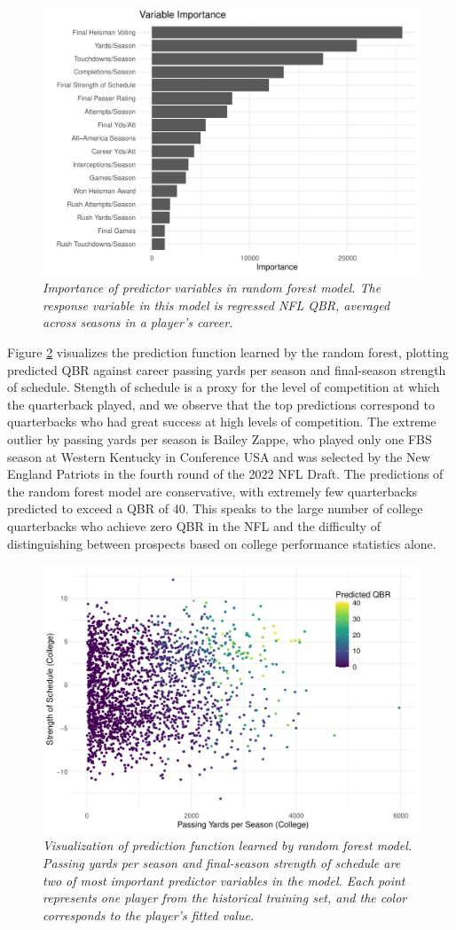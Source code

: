 \documentclass{article}
\begin{document}
\begin{figure}
    \centering
    \includegraphics[width=0.5\linewidth]{figures/variable_importance.pdf}
    \caption{\it Importance of predictor variables in random forest model. The response variable in this model is regressed NFL QBR, averaged across seasons in a player's career.}
    \label{fig:importance}
\end{figure}

Figure \ref{fig:3d-plot} visualizes the prediction function learned by the random forest, plotting predicted QBR against career passing yards per season and final-season strength of schedule. Stength of schedule is a proxy for the level of competition at which the quarterback played, and we observe that the top predictions correspond to quarterbacks who had great success at high levels of competition. The extreme outlier by passing yards per season is Bailey Zappe, who played only one FBS season at Western Kentucky in Conference USA and was selected by the New England Patriots in the fourth round of the 2022 NFL Draft. The predictions of the random forest model are conservative, with extremely few quarterbacks predicted to exceed a QBR of 40. This speaks to the large number of college quarterbacks who achieve zero QBR in the NFL and the difficulty of distinguishing between prospects based on college performance statistics alone.

\begin{figure}
    \centering
    \includegraphics[width=0.5\linewidth]{figures/3d_plot.pdf}
    \caption{\it Visualization of prediction function learned by random forest model. Passing yards per season and final-season strength of schedule are two of most important predictor variables in the model. Each point represents one player from the historical training set, and the color corresponds to the player's fitted value.}
    \label{fig:3d-plot}
\end{figure}
\end{document}
